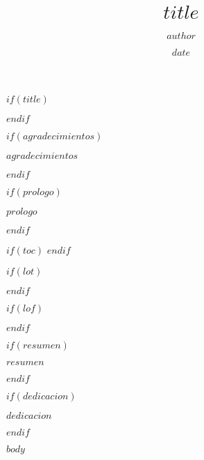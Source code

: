 \documentclass[12pt,oneside]{reedthesis}
\title{$title$}
\author{$author$}
\date{$date$}
\begin{document}
$if(title)$
  \maketitle
$endif$

\frontmatter %
\pagestyle{empty} %

$if(agradecimientos)$
  \begin{agradecimientos}
    $agradecimientos$
  \end{agradecimientos}
$endif$

$if(prologo)$
  \begin{prologo}
    $prologo$
  \end{prologo}
$endif$

$if(toc)$
  \hypersetup{linkcolor=$if(toccolor)$$toccolor$$else$black$endif$}
  \setcounter{tocdepth}{$toc-depth$}
  \tableofcontents
$endif$

$if(lot)$
  \listoftables
$endif$

$if(lof)$
  \listoffigures
$endif$

$if(resumen)$
  \begin{resumen}
    $resumen$
  \end{resumen}
$endif$

$if(dedicacion)$
  \begin{dedicacion}
    $dedicacion$
  \end{dedicacion}
$endif$

\mainmatter %
\pagestyle{fancyplain} %

$body$


\end{document}
